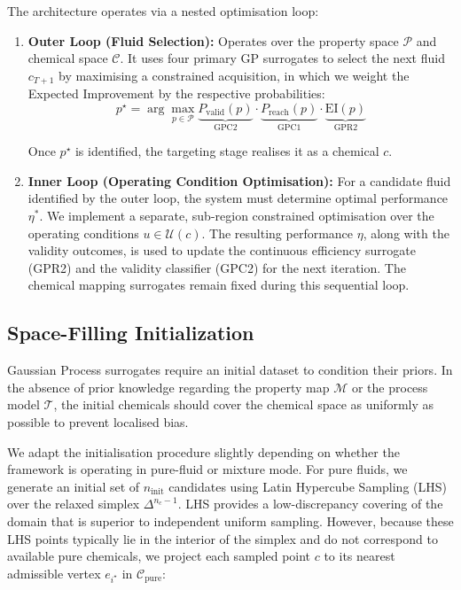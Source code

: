 \documentclass[preprint,12pt]{elsarticle}
\begin{document}
The architecture operates via a nested optimisation loop:
\begin{enumerate}
    \item \textbf{Outer Loop (Fluid Selection):} Operates over the property space $\mathcal{P}$ and chemical space $\mathcal{C}$. It uses four primary GP surrogates to select the next fluid $c_{T+1}$ by maximising a constrained acquisition, in which we weight the Expected Improvement by the respective probabilities:
    \begin{equation}
    \label{eq:constrained_acq}
    p^{\star} = \arg\max_{p \in \mathcal{P}} \underbrace{P_{\text{valid}}(p)}_{\mathrm{GPC2}} \cdot \underbrace{P_{\text{reach}}(p)}_{\mathrm{GPC1}} \cdot \underbrace{\mathrm{EI}(p)}_{\mathrm{GPR2}}
    \end{equation}

    Once $p^{\star}$ is identified, the targeting stage realises it as a chemical $c$.
        
    \item \textbf{Inner Loop (Operating Condition Optimisation):} For a candidate fluid identified by the outer loop, the system must determine optimal performance $\eta^*$. We implement a separate, sub-region constrained optimisation over the operating conditions $u \in \mathcal{U}(c)$. The resulting performance $\eta$, along with the validity outcomes, is used to update the continuous efficiency surrogate (GPR2) and the validity classifier (GPC2) for the next iteration. The chemical mapping surrogates remain fixed during this sequential loop.
\end{enumerate}


\subsection{Space-Filling Initialization}
Gaussian Process surrogates require an initial dataset to condition their priors. In the absence of prior knowledge regarding the property map $\mathcal{M}$ or the process model $\mathcal{T}$, the initial chemicals should cover the chemical space as uniformly as possible to prevent localised bias.

We adapt the initialisation procedure slightly depending on whether the framework is operating in pure-fluid or mixture mode. For pure fluids, we generate an initial set of $n_{\text{init}}$ candidates using Latin Hypercube Sampling (LHS) over the relaxed simplex $\Delta^{n_c-1}$. LHS provides a low-discrepancy covering of the domain that is superior to independent uniform sampling. However, because these LHS points typically lie in the interior of the simplex and do not correspond to available pure chemicals, we project each sampled point $c$ to its nearest admissible vertex $e_{i^\star}$ in $\mathcal{C}_{\text{pure}}$:
\end{document}
